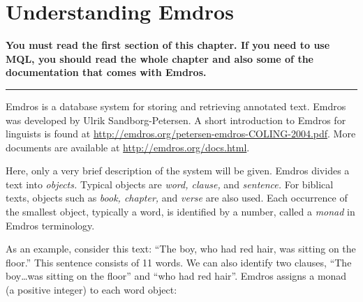\documentclass[11pt,oneside,a4paper]{memoir}
\begin{document}
\chapter{Understanding Emdros}\label{chap-emdros-use}

\textbf{You must read the first section of this chapter. If you need to use MQL, you should read the
  whole chapter and also some of the documentation that comes with Emdros.}

\plainbreak{3}

Emdros is a database system for storing and retrieving annotated text. Emdros was developed by Ulrik
Sandborg-Petersen. A short introduction to Emdros for linguists is found at
\url{http://emdros.org/petersen-emdros-COLING-2004.pdf}. More documents are available at
\url{http://emdros.org/docs.html}.

Here, only a very brief description of the system will be given. Emdros divides a text into
\emph{objects.} Typical objects are \emph{word, clause,} and \emph{sentence.} For biblical texts,
objects such as \emph{book, chapter,} and \emph{verse} are also used. Each occurrence of the
smallest object, typically a word, is identified by a number, called a \emph{monad} in Emdros terminology.

As an example, consider this text: ``The boy, who had red hair, was sitting on the floor.'' This
sentence consists of 11 words. We can also identify two clauses, ``The boy\ldots was sitting on the
floor'' and ``who had red hair''. Emdros assigns a monad (a positive integer) to each word object:
\end{document}
